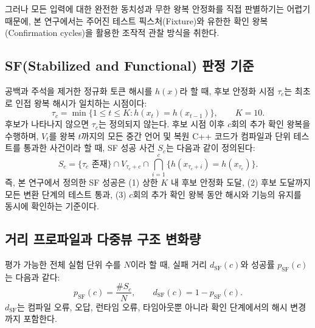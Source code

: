 \documentclass[a4paper,10pt,twocolumn,twoside]{article}
\newcommand{\psf}{p_{\mathrm{SF}}}
\newcommand{\dsf}{d_{\mathrm{SF}}}
\begin{document}
그러나 모든 입력에 대한 완전한 동치성과 무한 왕복 안정화를 직접 판별하기는 어렵기 때문에, 본 연구에서는 주어진 테스트 픽스처(Fixture)와 유한한 확인 왕복(Confirmation cycles)을 활용한 조작적 관찰 방식을 취한다.

\subsection{SF(Stabilized and Functional) 판정 기준}

공백과 주석을 제거한 정규화 토큰 해시를 $h(x)$라 할 때, 후보 안정화 시점 $\tau_c$는 최초로 인접 왕복 해시가 일치하는 시점이다:
\begin{equation}\label{eq:tau_c}
\tau_c = \min\{1 \leq t \leq K : h(x_t) = h(x_{t-1})\}, \qquad K=10.
\end{equation}
후보가 나타나지 않으면 $\tau_c$는 정의되지 않는다. 후보 시점 이후 $c$회의 추가 확인 왕복을 수행하며, $V_t$를 왕복 $t$까지의 모든 중간 언어 및 복원 C++ 코드가 컴파일과 단위 테스트를 통과한 사건이라 할 때, SF 성공 사건 $S_c$는 다음과 같이 정의된다:
\begin{equation}
S_c = \{\tau_c \text{ 존재}\} \cap V_{\tau_c + c} \cap \bigcap_{i=1}^{c} \{h(x_{\tau_c + i}) = h(x_{\tau_c})\}.
\end{equation}
즉, 본 연구에서 정의한 SF 성공은 (1) 상한 $K$ 내 후보 안정화 도달, (2) 후보 도달까지 모든 변환 단계의 테스트 통과, (3) $c$회의 추가 확인 왕복 동안 해시와 기능의 유지를 동시에 확인하는 기준이다.

\subsection{거리 프로파일과 다중뷰 구조 변화량}

평가 가능한 전체 실험 단위 수를 $N$이라 할 때, 실패 거리 $\dsf(c)$와 성공률 $\psf(c)$는 다음과 같다:
\begin{equation}
\psf(c) = \frac{\#S_c}{N}, \qquad \dsf(c) = 1 - \psf(c).
\end{equation}
$\dsf$는 컴파일 오류, 오답, 런타임 오류, 타임아웃뿐 아니라 확인 단계에서의 해시 변경까지 포함한다.
\end{document}
